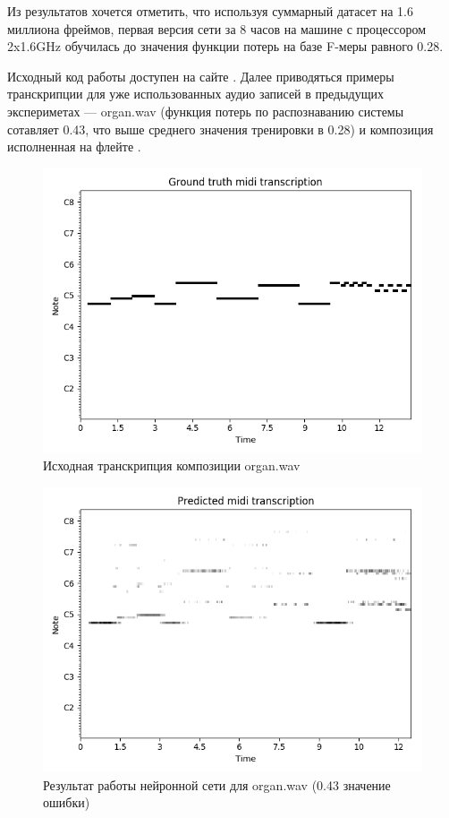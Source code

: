 Из результатов хочется отметить, что используя суммарный датасет на 1.6
миллиона фреймов, первая версия сети за 8 часов на машине с процессором
2x1.6GHz обучилась до значения функции потерь на базе F-меры равного 0.28.

Исходный код работы доступен на сайте \cite{L:music-recognizer}.
Далее приводяться
примеры транскрипции для уже использованных аудио записей в предыдущих
экспериметах --- organ.wav (функция потерь по распознаванию системы
сотавляет 0.43, что выше среднего значения тренировки в 0.28)
и композиция исполненная на флейте \cite{L:daj-ci-boza}.

\begin{figure}
  \centering
    \includegraphics[scale=.8]{res/organ-note-groundtruth.png}
  \centering
  \caption{Исходная транскрипция композиции organ.wav}
    \label{F:organ-notes}
\end{figure}

\begin{figure}
  \centering
    \includegraphics[scale=.8]{res/organ-overfit-028-acoustic.png}
  \centering
  \caption{Результат работы нейронной сети для organ.wav (0.43 значение ошибки)}
    \label{F:organ-pred}
\end{figure}

